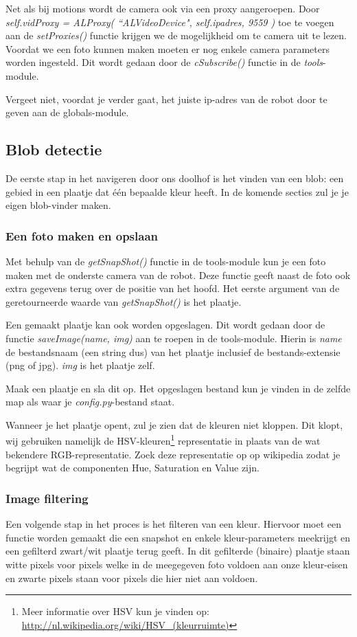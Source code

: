 \documentclass[a4paper]{article}
\begin{document}
Net als bij motions wordt de camera ook via een proxy aangeroepen. Door \textit{self.vidProxy = ALProxy( ``ALVideoDevice", self.ipadres, 9559 )} toe te voegen aan de \textit{setProxies()} functie krijgen we de mogelijkheid om te camera uit te lezen. Voordat we een foto kunnen maken moeten er nog enkele camera parameters worden ingesteld. Dit wordt gedaan door de \textit{cSubscribe()} functie in de \textit{tools}-module.

Vergeet niet, voordat je verder gaat, het juiste ip-adres van de robot door te geven aan de globals-module.

\subsection{Blob detectie}
De eerste stap in het navigeren door ons doolhof is het vinden van een blob: een gebied in een plaatje dat \'e\'en bepaalde kleur heeft. In de komende secties zul je je eigen blob-vinder maken.

\subsubsection{Een foto maken en opslaan}
Met behulp van de \textit{getSnapShot()} functie in de tools-module kun je een foto maken met de onderste camera van de robot. Deze functie geeft naast de foto ook extra gegevens terug over de positie van het hoofd. Het eerste argument van de geretourneerde waarde van \textit{getSnapShot()} is het plaatje.

Een gemaakt plaatje kan ook worden opgeslagen. Dit wordt gedaan door de functie \textit{saveImage(name, img)} aan te roepen in de tools-module. Hierin is \textit{name} de bestandsnaam (een string dus) van het plaatje inclusief de bestands-extensie (png of jpg). \textit{img} is het plaatje zelf.

Maak een plaatje en sla dit op. Het opgeslagen bestand kun je vinden in de zelfde map als waar je \textit{config.py}-bestand staat.

Wanneer je het plaatje opent, zul je zien dat de kleuren niet kloppen. Dit klopt, wij gebruiken namelijk de HSV-kleuren\footnote{Meer informatie over HSV kun je vinden op: \\ \url{http://nl.wikipedia.org/wiki/HSV_(kleurruimte)} } representatie in plaats van de wat bekendere RGB-representatie. Zoek deze representatie op op wikipedia zodat je begrijpt wat de componenten Hue, Saturation en Value zijn.

\subsubsection{Image filtering}
Een volgende stap in het proces is het filteren van een kleur. Hiervoor moet een functie worden gemaakt die een snapshot en enkele kleur-parameters meekrijgt en een gefilterd zwart/wit plaatje terug geeft. In dit gefilterde (binaire) plaatje staan witte pixels voor pixels welke in de meegegeven foto voldoen aan onze kleur-eisen en zwarte pixels staan voor pixels die hier niet aan voldoen.
\end{document}
